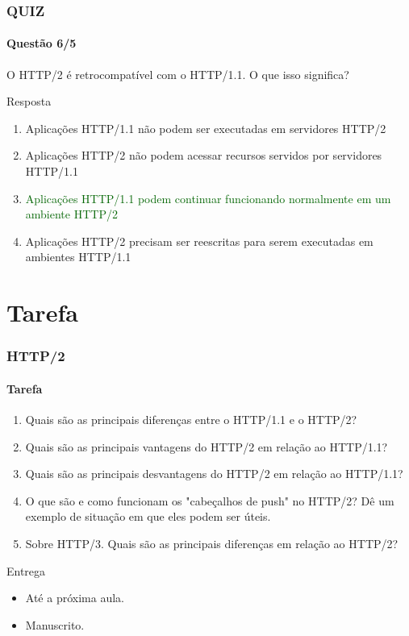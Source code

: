 \documentclass[
	9pt, %
	t, %
]{beamer}
\begin{document}
\begin{frame}
	\frametitle{QUIZ}
	\framesubtitle{Questão 6/5}

	{\Large O HTTP/2 é retrocompatível com o HTTP/1.1. O que isso significa? }

	\begin{exampleblock}{Resposta}
		\begin{enumerate}[a]
			\item Aplicações HTTP/1.1 não podem ser executadas em servidores HTTP/2
			\item Aplicações HTTP/2 não podem acessar recursos servidos por servidores HTTP/1.1
			\item \textcolor{darkgreen}{Aplicações HTTP/1.1 podem continuar funcionando normalmente em um ambiente HTTP/2}
			\item Aplicações HTTP/2 precisam ser reescritas para serem executadas em ambientes HTTP/1.1
		\end{enumerate}
	\end{exampleblock}

\end{frame}

\section{Tarefa}

\begin{frame}
	\frametitle{HTTP/2}
	\framesubtitle{Tarefa}

	\begin{enumerate}
		\item Quais são as principais diferenças entre o HTTP/1.1 e o HTTP/2?
		\item Quais são as principais vantagens do HTTP/2 em relação ao HTTP/1.1?
		\item Quais são as principais desvantagens do HTTP/2 em relação ao HTTP/1.1?
		\item O que são e como funcionam os "cabeçalhos de push" no HTTP/2? Dê um exemplo de situação em que eles podem ser úteis.
		\item Sobre HTTP/3. Quais são as principais diferenças em relação ao HTTP/2?
	\end{enumerate}

	\begin{exampleblock}{Entrega}
		\begin{itemize}
			\item Até a próxima aula.
			\item Manuscrito.
		\end{itemize}
	\end{exampleblock}

\end{frame}
\end{document}
